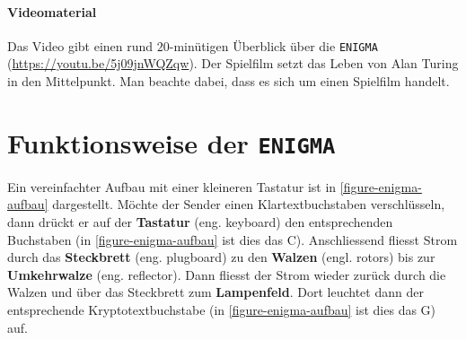 \paragraph{Videomaterial} Das Video  gibt einen rund $20$-minütigen Überblick über die \texttt{ENIGMA} (\url{https://youtu.be/5j09jnWQZqw}). Der Spielfilm  setzt das Leben von Alan Turing in den Mittelpunkt. Man beachte dabei, dass es sich um einen Spielfilm handelt.

\section{Funktionsweise der \texttt{ENIGMA}}

Ein vereinfachter Aufbau mit einer kleineren Tastatur ist in \autoref{figure-enigma-aufbau} dargestellt. Möchte der Sender einen Klartextbuchstaben verschlüsseln, dann drückt er auf der \textbf{Tastatur} (eng. keyboard) den entsprechenden Buchstaben (in \autoref{figure-enigma-aufbau} ist dies das C). Anschliessend fliesst Strom durch das \textbf{Steckbrett} (eng. plugboard) zu den \textbf{Walzen} (engl. rotors) bis zur \textbf{Umkehrwalze} (eng. reflector). Dann fliesst der Strom wieder zurück durch die Walzen und über das Steckbrett zum \textbf{Lampenfeld}. Dort leuchtet dann der entsprechende Kryptotextbuchstabe (in \autoref{figure-enigma-aufbau} ist dies das G) auf.

